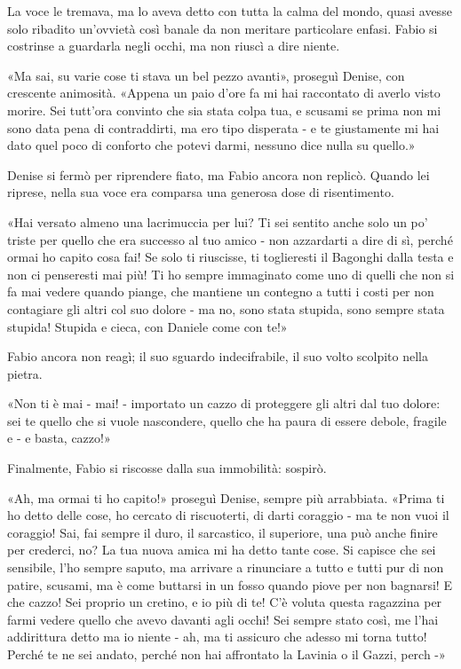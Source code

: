 La voce le tremava, ma lo aveva detto con tutta la calma del mondo, quasi avesse solo ribadito un'ovvietà così banale da non meritare particolare enfasi. Fabio si costrinse a guardarla negli occhi, ma non riuscì a dire niente.

«Ma sai, su varie cose ti stava un bel pezzo avanti», proseguì Denise, con crescente animosità. «Appena un paio d'ore fa mi hai raccontato di averlo visto morire. Sei tutt'ora convinto che sia stata colpa tua, e scusami se prima non mi sono data pena di contraddirti, ma ero tipo disperata - e te giustamente mi hai dato quel poco di conforto che potevi darmi, nessuno dice nulla su quello.»

Denise si fermò per riprendere fiato, ma Fabio ancora non replicò. Quando lei riprese, nella sua voce era comparsa una generosa dose di risentimento.

«Hai versato almeno una lacrimuccia per lui? Ti sei sentito anche solo un po' triste per quello che era successo al tuo amico - non azzardarti a dire di sì, perché ormai ho capito cosa fai! Se solo ti riuscisse, ti toglieresti il Bagonghi dalla testa e non ci penseresti mai più! Ti ho sempre immaginato come uno di quelli che non si fa mai vedere quando piange, che mantiene un contegno a tutti i costi per non contagiare gli altri col suo dolore - ma no, sono stata stupida, sono sempre stata stupida! Stupida e cieca, con Daniele come con te!»

Fabio ancora non reagì; il suo sguardo indecifrabile, il suo volto scolpito nella pietra.

«Non ti è mai - mai! - importato un cazzo di proteggere gli altri dal tuo dolore: sei te quello che si vuole nascondere, quello che ha paura di essere debole, fragile e - e basta, cazzo!»

Finalmente, Fabio si riscosse dalla sua immobilità: sospirò.

«Ah, ma ormai ti ho capito!» proseguì Denise, sempre più arrabbiata. «Prima ti ho detto delle cose, ho cercato di riscuoterti, di darti coraggio - ma te non vuoi il coraggio! Sai, fai sempre il duro, il sarcastico, il superiore, una può anche finire per crederci, no? La tua nuova amica mi ha detto tante cose. Si capisce che sei sensibile, l'ho sempre saputo, ma arrivare a rinunciare a tutto e tutti pur di non patire, scusami, ma è come buttarsi in un fosso quando piove per non bagnarsi! E che cazzo! Sei proprio un cretino, e io più di te! C'è voluta questa ragazzina per farmi vedere quello che avevo davanti agli occhi! Sei sempre stato così, me l'hai addirittura detto ma io niente - ah, ma ti assicuro che adesso mi torna tutto! Perché te ne sei andato, perché non hai affrontato la Lavinia o il Gazzi, perch -»

